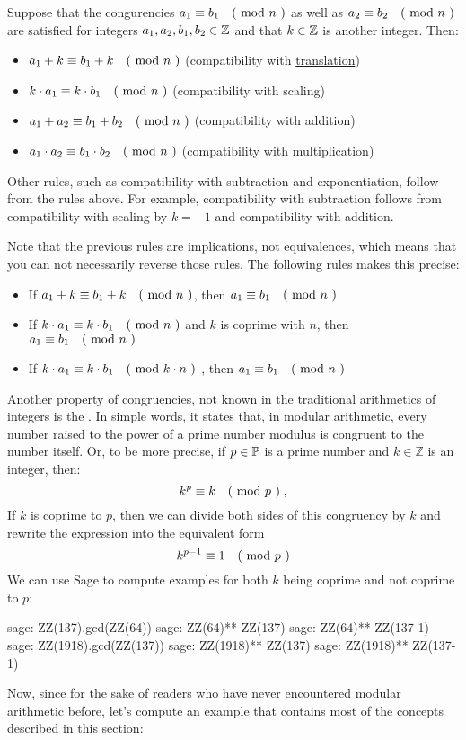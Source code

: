 Suppose that the congurencies $a_1 \equiv b_1 \quad \text{( mod } n \text{ )}$ as well as $a_2 \equiv b_2 \quad \text{( mod } n \text{ )}$ are satisfied for integers $a_1,a_2,b_1,b_2\in\mathbb{Z}$ and that $k\in\mathbb{Z}$ is another integer. Then:
\begin{itemize}
\item $a_1+k \equiv b_1+k \quad \text{( mod } n \text{ )}$ (compatibility with \href{https://en.wikipedia.org/wiki/Translation_(geometry)}{translation})
\item $k\cdot a_1 \equiv k\cdot b_1 \quad \text{( mod } n \text{ )}$ (compatibility with scaling)
\item $a_1+a_2 \equiv b_1+b_2 \quad \text{( mod } n \text{ )}$ (compatibility with addition)
\item $a_1\cdot a_2 \equiv b_1\cdot b_2 \quad \text{( mod } n \text{ )}$ (compatibility with multiplication)
\end{itemize}
Other rules, such as compatibility with subtraction and exponentiation, follow from the rules above. For example, compatibility with subtraction follows from compatibility with scaling by $k=-1$ and compatibility with addition.

Note that the previous rules are implications, not equivalences, which means that you can not necessarily reverse those rules. The following rules makes this precise:
\begin{itemize}
\item If $a_1+k \equiv b_1+k \quad \text{( mod } n \text{ )}$, then $a_1 \equiv b_1 \quad \text{( mod } n \text{ )}$
\item If $k\cdot a_1 \equiv k\cdot b_1 \quad \text{( mod } n \text{ )}$ and $k$ is coprime with $n$, then $a_1 \equiv b_1 \quad \text{( mod } n \text{ )}$
\item If $k\cdot a_1 \equiv k\cdot b_1 \quad \text{( mod } k\cdot n \text{ )}$ , then $a_1 \equiv b_1 \quad \text{( mod } n \text{ )}$
\end{itemize}
Another property of congruencies, not known in the traditional arithmetics of integers is the  . In simple words, it states that, in modular arithmetic, every number raised to the power of a prime number modulus is congruent to the number itself. Or, to be more precise, if $ p \in \mathbb{P} $ is a prime number and $ k \in \mathbb{Z} $ is an integer, then:
\begin{equation}
k ^ p \equiv k \quad \text{( mod } p \text{ )} \;,
\end{equation}
If $k$ is coprime to $p$, then we can divide both sides of this congruency by $k$ and rewrite the expression into the equivalent form 
\begin{equation}
\label{eq_fermat_lt_2}
k ^{p-1} \equiv 1 \quad \text{( mod } p \text{ )}
\end{equation} 
We can use Sage to compute examples for both $k$ being coprime and not coprime to $p$:
\begin{sagecommandline}
sage: ZZ(137).gcd(ZZ(64))
sage: ZZ(64)** ZZ(137) %
sage: ZZ(64)** ZZ(137-1) %
sage: ZZ(1918).gcd(ZZ(137))
sage: ZZ(1918)** ZZ(137) %
sage: ZZ(1918)** ZZ(137-1) %
\end{sagecommandline}
Now, since for the sake of readers who have never encountered modular arithmetic before, let's compute an example that contains most of the concepts described in this section:   
   
